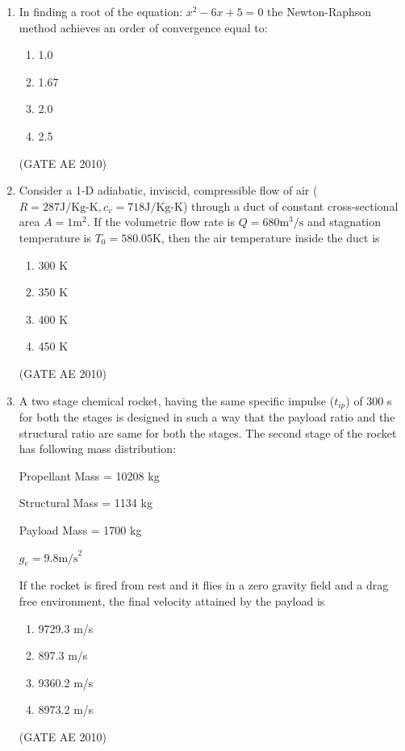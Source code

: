 \documentclass[journal]{IEEEtran}
\begin{document}
\begin{enumerate}
\item In finding a root of the equation: $ x^2 - 6x + 5 = 0 $ the Newton-Raphson method achieves an order of convergence equal to:
\begin{multicols}{4}
\begin{enumerate}
\item 1.0
\item 1.67
\item 2.0
\item 2.5
\end{enumerate}
\end{multicols}
\hfill (GATE AE 2010)

\item Consider a 1-D adiabatic, inviscid, compressible flow of air ($ R = 287  \text{J/Kg-K}, c_v = 718  \text{J/Kg-K} $) through a duct of constant cross-sectional area $ A = 1  \text{m}^2 $. If the volumetric flow rate is $ Q = 680  \text{m}^3/\text{s} $ and stagnation temperature is $ T_0 = 580.05  \text{K} $, then the air temperature inside the duct is
\begin{multicols}{4}
\begin{enumerate}
\item 300 K
\item 350 K
\item 400 K
\item 450 K
\end{enumerate}
\end{multicols}
\hfill (GATE AE 2010)

\item A two stage chemical rocket, having the same specific impulse ($ t_{ip} $) of 300 s for both the stages is designed in such a way that the payload ratio and the structural ratio are same for both the stages. The second stage of the rocket has following mass distribution:
    
    Propellant Mass = 10208 kg 
    
    Structural Mass = 1134 kg 
    
    Payload Mass = 1700 kg 
    
    $ g_e = 9.8  \text{m/s}^2 $ 
    
    If the rocket is fired from rest and it flies in a zero gravity field and a drag free environment, the final velocity attained by the payload is
\begin{multicols}{4}
\begin{enumerate}
\item 9729.3 m/s
\item 897.3 m/s
\item 9360.2 m/s
\item 8973.2 m/s
\end{enumerate}
\end{multicols}
\hfill (GATE AE 2010)


\end{enumerate}
\end{document}
